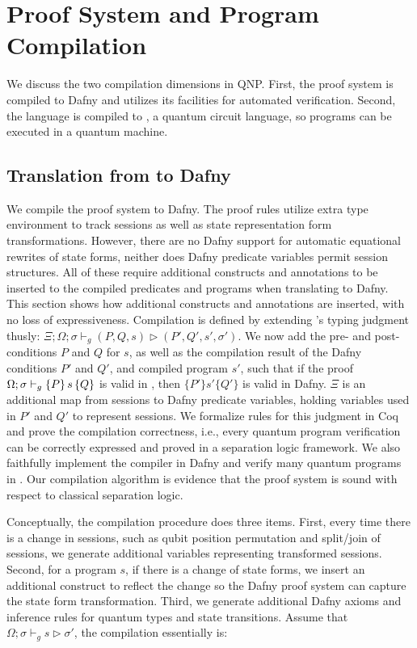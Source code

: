 \section{\qafny Proof System and Program Compilation}

We discuss the two compilation dimensions in QNP. First, the \qafny proof system is compiled to Dafny and utilizes its facilities for automated verification. Second, the \qafny language is compiled to \sqir, a quantum circuit language, so \qafny programs can be executed in a quantum machine.

\subsection{Translation from \qafny to Dafny}\label{sec:dafny-compilation}

We compile the \qafny proof system to Dafny.
The \qafny proof rules utilize extra type environment to track sessions as well as state representation form transformations.
However, there are no Dafny support for automatic equational rewrites of state forms, neither does Dafny predicate variables permit session structures.
All of these require additional constructs and annotations
 to be inserted to the compiled predicates and programs when translating \qafny to Dafny.
This section shows how additional constructs and annotations are inserted, with no loss of expressiveness.
Compilation is defined by extending \qafny's
typing judgment thusly: $\Xi;\Omega;\sigma\vdash_g (P,Q,s) \triangleright (P',Q',s',\sigma')$.
We now add the pre- and post-conditions $P$ and $Q$ for $s$, as well as the compilation result of the Dafny conditions $P'$ and $Q'$, and compiled program $s'$, such that if the proof $\Omega;\sigma\vdash_{g}\{P\}\, s \,\{Q\}$ is valid in \qafny, then $\{P'\} s' \{Q'\}$ is valid in Dafny. $\Xi$ is an additional map from sessions to Dafny predicate variables, holding variables used in $P'$ and $Q'$ to represent sessions. We formalize rules for this judgment in Coq and prove the compilation correctness, i.e., every \qafny quantum program verification can be correctly expressed and proved in a separation logic framework. We also faithfully implement the compiler in Dafny and verify many quantum programs in .
Our compilation algorithm is evidence that the \qafny proof system is sound with respect to classical separation logic.

Conceptually, the compilation procedure does three items. First, every time there is a change in sessions, such as qubit position permutation and split/join of sessions, we generate additional variables representing transformed sessions. Second, for a program $s$, if there is a change of state forms, we insert an additional construct to reflect the change so the Dafny proof system can capture the state form transformation. Third, we generate additional Dafny axioms and inference rules for quantum types and state transitions. Assume that $\Omega;\sigma\vdash_g s \triangleright \sigma'$, the compilation essentially is:

